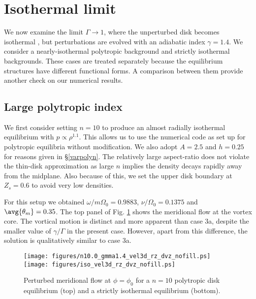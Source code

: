 \section{Isothermal limit}\label{isothermal}
We now examine the limit $\Gamma\to 1$, where the unperturbed disk becomes isothermal
, but perturbations are evolved with an adiabatic index
$\gamma=1.4$. We consider a nearly-isothermal polytropic background
and strictly isothermal backgrounds. These cases are treated
separately because the equilibrium structures have different
functional forms. A comparison between them provide another
check on our numerical results. 

\subsection{Large polytropic index}
We first consider setting $n=10$ to produce an almost radially
isothermal equilibrium with $p\propto \rho^{1.1}$. This allows us to use the
numerical code as set up for polytropic equilibria without
modification. We also adopt $A=2.5$ and $h=0.25$ for reasons given
in \S\ref{varpolyn}. The relatively large aspect-ratio does not
violate the thin-disk approximation as large $n$ implies the 
density decays rapidly away from the midplane. Also because of this,
we set the upper disk boundary at $Z_s=0.6$ to avoid very low 
densities. %


For this setup we obtained $\omega/m\Omega_0=0.9883$,
$\nu/\Omega_0=0.1375$ and $\avg{\theta_m}=0.35$. The top panel of
Fig. \ref{polyn10} shows the meridional flow at the vortex core. The
vortical motion is distinct and more apparent than case 3a, despite
the smaller value of $\gamma/\Gamma$ in the present case. 
However, apart from this difference, the solution is qualitatively
similar to case 3a.   

\begin{figure}[!t]
  \centering
  \texttt{[image: figures/n10.0\_gmma1.4\_vel3d\_rz\_dvz\_nofill.ps]}
   \texttt{[image: figures/iso\_vel3d\_rz\_dvz\_nofill.ps]}
  \caption{Perturbed meridional flow at $\phi=\phi_0$ for a $n=10$
    polytropic disk equilibrium (top) and a strictly isothermal
    equilibrium (bottom). 
    \label{polyn10}}
\end{figure}



